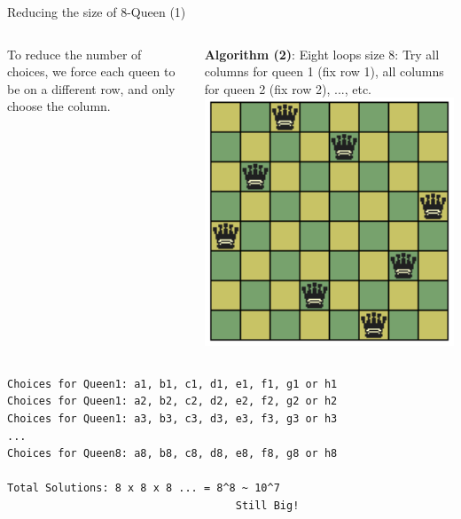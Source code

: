 \begin{frame}[fragile]{Reducing the size of 8-Queen (1)}

  \begin{columns}
    To reduce the number of choices, we force each queen to be on a different row, and only choose the column.\bigskip

    {\bf Algorithm (2)}: Eight loops size 8: Try all columns for queen 1 (fix row 1), all columns for queen 2 (fix row 2), ..., etc.
    \includegraphics[width=1\textwidth]{img/8queen}
  \end{columns}
\begin{verbatim}
Choices for Queen1: a1, b1, c1, d1, e1, f1, g1 or h1
Choices for Queen1: a2, b2, c2, d2, e2, f2, g2 or h2
Choices for Queen1: a3, b3, c3, d3, e3, f3, g3 or h3
...
Choices for Queen8: a8, b8, c8, d8, e8, f8, g8 or h8

Total Solutions: 8 x 8 x 8 ... = 8^8 ~ 10^7
                                    Still Big!
\end{verbatim}
\end{frame}

